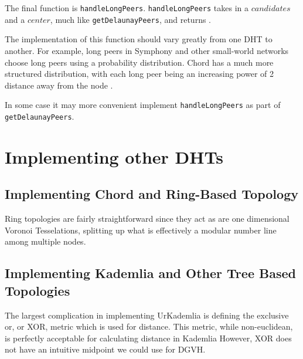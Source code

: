\documentclass[11pt,conference]{IEEEtran}
\begin{document}
The final function is \texttt{handleLongPeers}.
\texttt{handleLongPeers} takes in a $ candidates $ and a $ center$, much like \texttt{getDelaunayPeers}, and returns .

The implementation of this function should vary greatly from one DHT to another.
For example, long peers in Symphony \cite{symphony} and other small-world \cite{kleinberg2000navigation} networks choose long peers using a probability distribution.
Chord has a much more structured distribution, with each long peer being an increasing power of 2 distance away from the node \cite{chord}.



In some case it may more convenient implement \texttt{handleLongPeers} as part of \texttt{getDelaunayPeers}.





\section{Implementing other DHTs}
\label{sec:implement}
\subsection{Implementing Chord and Ring-Based Topology}

Ring topologies are fairly straightforward since they act as are one dimensional Voronoi Tesselations, splitting up what is effectively a modular number line among multiple nodes.





\subsection{Implementing Kademlia and Other Tree Based Topologies}
The largest complication in implementing UrKademlia is defining the exclusive or, or XOR, metric which is used for distance.
This metric, while non-euclidean, is perfectly acceptable for calculating distance in Kademlia \cite{kademlia}
However, XOR does not have an intuitive midpoint we could use for DGVH.
\end{document}
